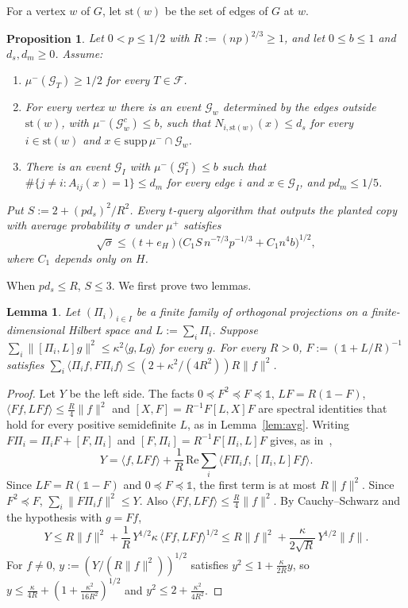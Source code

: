 \documentclass[11pt]{article}
\newtheorem{lemma}[theorem]{Lemma}
\newtheorem{proposition}[theorem]{Proposition}
\theoremstyle{remark}
\newcommand{\Fam}{\mathcal{F}}
\newcommand{\st}{\mathrm{st}}
\newcommand{\Id}{\mathbb{1}}
\newcommand{\norm}[1]{\lVert #1\rVert}
\newcommand{\ip}[2]{\langle #1, #2\rangle}
\newcommand{\Ev}{\mathcal{G}}
\begin{document}
For a vertex $w$ of $G$, let $\st(w)$ be the set of edges of $G$ at $w$.

\begin{proposition}\label{prop:master}
Let $0<p\le1/2$ with $R:=(np)^{2/3}\ge1$, and let $0\le b\le1$ and $d_s,d_m\ge0$. Assume:
\begin{enumerate}
\item[(P)] $\mu^-(\Ev_T)\ge1/2$ for every $T\in\Fam$.
\item[(S)] For every vertex $w$ there is an event $\Ev_w$ determined by the edges outside $\st(w)$, with $\mu^-(\Ev_w^c)\le b$, such that $N_{i,\st(w)}(x)\le d_s$ for every $i\in\st(w)$ and $x\in\mathrm{supp}\,\mu^-\cap\Ev_w$.
\item[(I)] There is an event $\Ev_I$ with $\mu^-(\Ev_I^c)\le b$ such that $\#\{j\ne i:A_{ij}(x)=1\}\le d_m$ for every edge $i$ and $x\in\Ev_I$, and $pd_m\le1/5$.
\end{enumerate}
Put $S:=2+(pd_s)^2/R^2$. Every $t$-query algorithm that outputs the planted copy with average probability $\sigma$ under $\mu^+$ satisfies
\[\sqrt\sigma\le(t+e_H)\bigl(C_1S\,n^{-7/3}p^{-1/3}+C_1n^4b\bigr)^{1/2},\]
where $C_1$ depends only on $H$.
\end{proposition}

When $pd_s\le R$, $S\le3$. We first prove two lemmas.

\begin{lemma}\label{lem:sumproj}
Let $(\Pi_i)_{i\in I}$ be a finite family of orthogonal projections on a finite-dimensional Hilbert space and $L:=\sum_i\Pi_i$. Suppose $\sum_i\norm{[\Pi_i,L]g}^2\le\kappa^2\ip g{Lg}$ for every $g$. For every $R>0$, $F:=(\Id+L/R)^{-1}$ satisfies $\sum_i\ip{\Pi_if}{F\Pi_if}\le(2+\kappa^2/(4R^2))R\norm f^2$.
\end{lemma}

\begin{proof}
Let $Y$ be the left side. The facts $0\preceq F^2\preceq F\preceq\Id$, $LF=R(\Id-F)$, $\ip{Ff}{LFf}\le\frac R4\norm f^2$ and $[X,F]=R^{-1}F[L,X]F$ are spectral identities that hold for every positive semidefinite $L$, as in Lemma~\ref{lem:avg}. Writing $F\Pi_i=\Pi_iF+[F,\Pi_i]$ and $[F,\Pi_i]=R^{-1}F[\Pi_i,L]F$ gives, as in~\cite[(4.23)]{CGZ26},
\[Y=\ip f{LFf}+\frac1R\,\mathrm{Re}\sum_i\ip{F\Pi_if}{[\Pi_i,L]Ff}.\]
Since $LF=R(\Id-F)$ and $0\preceq F\preceq\Id$, the first term is at most $R\norm f^2$. Since $F^2\preceq F$, $\sum_i\norm{F\Pi_if}^2\le Y$. Also $\ip{Ff}{LFf}\le\frac R4\norm f^2$. By Cauchy--Schwarz and the hypothesis with $g=Ff$,
\[Y\le R\norm f^2+\frac1R\,Y^{1/2}\kappa\,\ip{Ff}{LFf}^{1/2}\le R\norm f^2+\frac{\kappa}{2\sqrt R}\,Y^{1/2}\norm f.\]
For $f\ne0$, $y:=(Y/(R\norm f^2))^{1/2}$ satisfies $y^2\le1+\frac\kappa{2R}y$, so $y\le\frac\kappa{4R}+(1+\frac{\kappa^2}{16R^2})^{1/2}$ and $y^2\le2+\frac{\kappa^2}{4R^2}$.
\end{proof}
\end{document}
